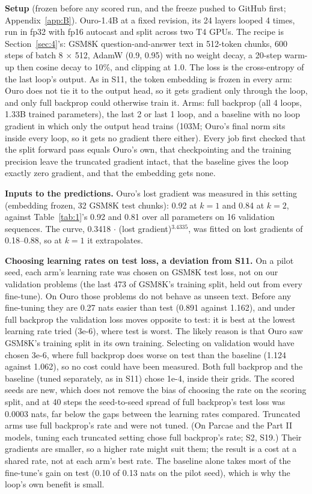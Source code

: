 \documentclass[10pt]{article}
\begin{document}
\textbf{Setup} (frozen before any scored run, and the freeze pushed to GitHub first; Appendix~\ref{app:B}). Ouro-1.4B at a fixed revision, its 24 layers looped 4 times, run in fp32 with fp16 autocast and split across two T4 GPUs. The recipe is Section~\ref{sec:4}'s: GSM8K question-and-answer text in 512-token chunks, 600 steps of batch 8 $\times$ 512, AdamW (0.9, 0.95) with no weight decay, a 20-step warm-up then cosine decay to 10\%, and clipping at 1.0. The loss is the cross-entropy of the last loop's output. As in S11, the token embedding is frozen in every arm: Ouro does not tie it to the output head, so it gets gradient only through the loop, and only full backprop could otherwise train it. Arms: full backprop (all 4 loops, 1.33B trained parameters), the last 2 or last 1 loop, and a baseline with no loop gradient in which only the output head trains (103M; Ouro's final norm sits inside every loop, so it gets no gradient there either). Every job first checked that the split forward pass equals Ouro's own, that checkpointing and the training precision leave the truncated gradient intact, that the baseline gives the loop exactly zero gradient, and that the embedding gets none.

\textbf{Inputs to the predictions.} Ouro's lost gradient was measured in this setting (embedding frozen, 32 GSM8K test chunks): 0.92 at $k = 1$ and 0.84 at $k = 2$, against Table~\ref{tab:1}'s 0.92 and 0.81 over all parameters on 16 validation sequences. The curve, 0.3418 $\cdot$ (lost gradient)$^{3.4335}$, was fitted on lost gradients of 0.18--0.88, so at $k = 1$ it extrapolates.

\textbf{Choosing learning rates on test loss, a deviation from S11.} On a pilot seed, each arm's learning rate was chosen on GSM8K test loss, not on our validation problems (the last 473 of GSM8K's training split, held out from every fine-tune). On Ouro those problems do not behave as unseen text. Before any fine-tuning they are 0.27 nats easier than test (0.891 against 1.162), and under full backprop the validation loss moves opposite to test: it is best at the lowest learning rate tried (3e-6), where test is worst. The likely reason is that Ouro saw GSM8K's training split in its own training. Selecting on validation would have chosen 3e-6, where full backprop does worse on test than the baseline (1.124 against 1.062), so no cost could have been measured. Both full backprop and the baseline (tuned separately, as in S11) chose 1e-4, inside their grids. The scored seeds are new, which does not remove the bias of choosing the rate on the scoring split, and at 40 steps the seed-to-seed spread of full backprop's test loss was 0.0003 nats, far below the gaps between the learning rates compared. Truncated arms use full backprop's rate and were not tuned. (On Parcae and the Part II models, tuning each truncated setting chose full backprop's rate; S2, S19.) Their gradients are smaller, so a higher rate might suit them; the result is a cost at a shared rate, not at each arm's best rate. The baseline alone takes most of the fine-tune's gain on test (0.10 of 0.13 nats on the pilot seed), which is why the loop's own benefit is small.
\end{document}
